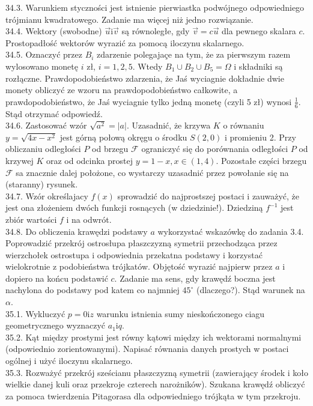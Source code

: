 \documentclass[10pt]{article}
\begin{document}
34.3. Warunkiem styczności jest istnienie pierwiastka podwójnego odpowiedniego trójmianu kwadratowego. Zadanie ma więcej niż jedno rozwiązanie.\\
34.4. Wektory (swobodne) $\vec{u} \mathrm{i} \vec{v}$ są równoległe, gdy $\vec{v}=c \vec{u}$ dla pewnego skalara $c$. Prostopadłość wektorów wyrazić za pomocą iloczynu skalarnego.\\
34.5. Oznaczyć przez $B_{i}$ zdarzenie polegajaçe na tym, że za pierwszym razem wylosowano monetę $i$ zł, $i=1,2,5$. Wtedy $B_{1} \cup B_{2} \cup B_{5}=\Omega$ i składniki są rozłączne. Prawdopodobieństwo zdarzenia, że Jaś wyciagnie dokładnie dwie monety obliczyć ze wzoru na prawdopodobieństwo całkowite, a prawdopodobieństwo, że Jaś wyciagnie tylko jedną monetę (czyli 5 zł) wynosi $\frac{1}{6}$. Stąd otrzymać odpowiedź.\\
34.6. Zastosować wzór $\sqrt{a^{2}}=|a|$. Uzasadnić, że krzywa $K$ o równaniu $y=\sqrt{4 x-x^{2}}$ jest górną połową okręgu o środku $S(2,0)$ i promieniu 2. Przy obliczaniu odległości $P$ od brzegu $\mathcal{F}$ ograniczyć się do porównania odległości $P$ od krzywej $K$ oraz od odcinka prostej $y=1-x, x \in(1,4)$. Pozostałe części brzegu $\mathcal{F}$ sa znacznie dalej położone, co wystarczy uzasadnić przez powołanie się na (staranny) rysunek.\\
34.7. Wzór określajacy $f(x)$ sprowadzić do najprostszej postaci i zauważyć, że jest ona złożeniem dwóch funkcji rosnących (w dziedzinie!). Dziedziną $f^{-1}$ jest zbiór wartości $f$ i na odwrót.\\
34.8. Do obliczenia krawędzi podstawy $a$ wykorzystać wskazówkę do zadania 3.4. Poprowadzić przekrój ostrosłupa płaszczyzną symetrii przechodząca przez wierzchołek ostrostupa i odpowiednia przekatna podstawy i korzystać wielokrotnie z podobieństwa trójkatów. Objętość wyrazić najpierw przez $a$ i dopiero na końcu podstawić $c$. Zadanie ma sens, gdy krawędź boczna jest nachylona do podstawy pod katem co najmniej $45^{\circ}$ (dlaczego?). Stąd warunek na $\alpha$.\\
35.1. Wykluczyć $p=0 \mathrm{i} z$ warunku istnienia sumy nieskończonego ciagu geometrycznego wyznaczyć $a_{1} \mathrm{i} q$.\\
35.2. Kąt między prostymi jest równy kątowi między ich wektorami normalnymi (odpowiednio zorientowanymi). Napisać równania danych prostych w postaci ogólnej i użyć iloczynu skalarnego.\\
35.3. Rozważyć przekrój sześcianu płaszczyzną symetrii (zawierający środek i koło wielkie danej kuli oraz przekroje czterech narożników). Szukana krawędź obliczyć za pomoca twierdzenia Pitagorasa dla odpowiedniego trójkąta w tym przekroju.\\
\end{document}
